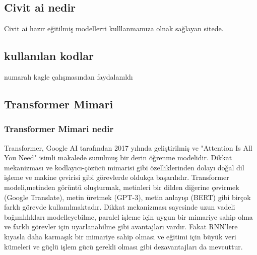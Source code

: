 \documentclass[12pt, a4paper]{article}
\begin{document}
	\subsection{Civit ai nedir}
	Civit ai hazır eğitilmiş modellerri kulllanmamıza olnak sağlayan sitede.
	\cite{civitai}\cite{github1111}
	\subsection{kullanılan kodlar}
	\cite{mimari} numaralı kagle çalışmasından faydalanıldı
	
	\subsection{Transformer Mimari}
	\subsubsection{Transformer Mimari nedir}
	Transformer, Google AI tarafından 2017 yılında geliştirilmiş ve "Attention Is All You Need" isimli makalede sunulmuş bir derin öğrenme modelidir. Dikkat mekanizması ve kodlayıcı-çözücü mimarisi gibi özelliklerinden dolayı doğal dil işleme ve makine çevirisi gibi görevlerde oldukça başarılıdır. Transformer modeli,metinden görüntü oluşturmak, metinleri bir dilden diğerine çevirmek (Google Translate), metin üretmek (GPT-3), metin anlayışı (BERT) gibi birçok farklı görevde kullanılmaktadır. Dikkat mekanizması sayesinde uzun vadeli bağımlılıkları modelleyebilme, paralel işleme için uygun bir mimariye sahip olma ve farklı görevler için uyarlanabilme gibi avantajları vardır. Fakat RNN'lere kıyasla daha karmaşık bir mimariye sahip olması ve eğitimi için büyük veri kümeleri ve güçlü işlem gücü gerekli olması gibi dezavantajları da mevcuttur.\cite{transformator2}
\end{document}
